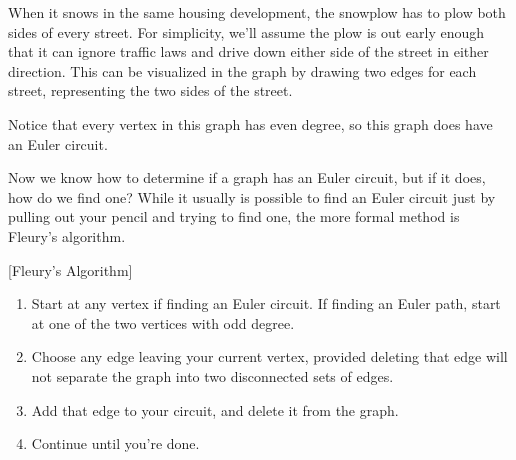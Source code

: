 \begin{example}{}{}%
When it snows in the same housing development, the snowplow has to plow both sides of every street.  For simplicity, we'll assume the plow is out early enough that it can ignore traffic laws and drive down either side of the street in either direction.  This can be visualized in the graph by drawing two edges for each street, representing the two sides of the street.\\



Notice that every vertex in this graph has even degree, so this graph does have an Euler circuit.  
\end{example}

Now we know how to determine if a graph has an Euler circuit, but if it does, how do we find one?  While it usually is possible to find an Euler circuit just by pulling out your pencil and trying to find one, the more formal method is Fleury's algorithm.


\begin{algorithm}{}{}[Fleury's Algorithm]
\hspace{3in}
\begin{enumerate}
\item	Start at any vertex if finding an Euler circuit.  If finding an Euler path, start at one of the two vertices with odd degree.
\item	Choose any edge leaving your current vertex, provided deleting that edge will not separate the graph into two disconnected sets of edges.
\item	Add that edge to your circuit, and delete it from the graph.
\item	Continue until you're done.
\end{enumerate}
\end{algorithm}

